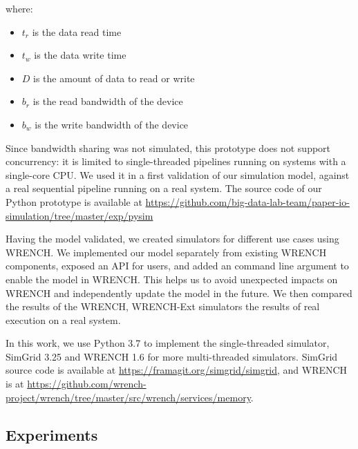\documentclass[conference]{IEEEtran}
\begin{document}
            where:
            \begin{itemize}
                \item $t_{r}$ is the data read time
                \item $t_{w}$ is the data write time
                \item $D$ is the amount of data to read or write
                \item $b_r$ is the read bandwidth of the device
                \item $b_w$ is the write bandwidth of the device
            \end{itemize}            

            Since bandwidth sharing was not simulated, this prototype does not support 
            concurrency: it is limited to single-threaded pipelines running on systems 
            with a single-core CPU. We used it in a first validation of our simulation 
            model, against a real sequential pipeline running on a real system.
            The source code of our Python prototype is available at 
            \url{https://github.com/big-data-lab-team/paper-io-simulation/tree/master/exp/pysim}
            
            Having the model validated, we created simulators for different use cases 
            using WRENCH.
            We implemented our model separately from existing WRENCH components, 
            exposed an API for users, and added an command line argument to enable 
            the model in WRENCH. 
            This helps us to avoid unexpected impacts on WRENCH and 
            independently update the model in the future. 
            We then compared the results of the WRENCH, WRENCH-Ext simulators 
            the results of real execution on a real system. 
        
            In this work, we use Python 3.7 to implement the single-threaded simulator, 
            SimGrid 3.25 and WRENCH 1.6 for more multi-threaded simulators. 
            SimGrid source code is available at \url{https://framagit.org/simgrid/simgrid}, 
            and WRENCH is at 
            \url{https://github.com/wrench-project/wrench/tree/master/src/wrench/services/memory}.
            
        \subsection{Experiments}
        
\end{document}
